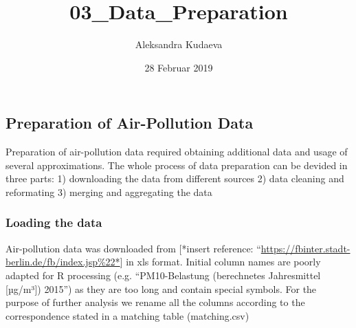 \documentclass[]{article}
\title{03\_Data\_Preparation}
\author{Aleksandra Kudaeva}
\date{28 Februar 2019}
\newenvironment{Shaded}{\begin{snugshade}}{\end{snugshade}}
\newcommand{\KeywordTok}[1]{\textcolor[rgb]{0.13,0.29,0.53}{\textbf{#1}}}
\newcommand{\DataTypeTok}[1]{\textcolor[rgb]{0.13,0.29,0.53}{#1}}
\newcommand{\DecValTok}[1]{\textcolor[rgb]{0.00,0.00,0.81}{#1}}
\newcommand{\StringTok}[1]{\textcolor[rgb]{0.31,0.60,0.02}{#1}}
\newcommand{\CommentTok}[1]{\textcolor[rgb]{0.56,0.35,0.01}{\textit{#1}}}
\newcommand{\OtherTok}[1]{\textcolor[rgb]{0.56,0.35,0.01}{#1}}
\newcommand{\OperatorTok}[1]{\textcolor[rgb]{0.81,0.36,0.00}{\textbf{#1}}}
\newcommand{\NormalTok}[1]{#1}
\begin{document}
\maketitle

\subsection{Preparation of Air-Pollution
Data}\label{preparation-of-air-pollution-data}

Preparation of air-pollution data required obtaining additional data and
usage of several approximations. The whole process of data preparation
can be devided in three parts: 1) downloading the data from different
sources 2) data cleaning and reformating 3) merging and aggregating the
data

\subsubsection{Loading the data}\label{loading-the-data}

Air-pollution data was downloaded from {[}*insert reference:
``\url{https://fbinter.stadt-berlin.de/fb/index.jsp\%22*}{]} in xls
format. Initial column names are poorly adapted for R processing (e.g.
``PM10-Belastung (berechnetes Jahresmittel {[}µg/m³{]}) 2015'') as they
are too long and contain special symbols. For the purpose of further
analysis we rename all the columns according to the correspondence
stated in a matching table (matching.csv)

\begin{Shaded}
\end{Shaded}
\end{document}
